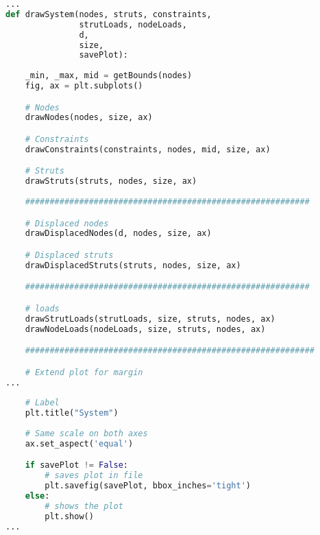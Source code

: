 \begin{inconsolata}
\begin{minipage}{\linewidth}
\begin{lstlisting}[language=python]
...
def drawSystem(nodes, struts, constraints,
               strutLoads, nodeLoads,
               d,
               size,
               savePlot):
    
    _min, _max, mid = getBounds(nodes)
    fig, ax = plt.subplots() 

    # Nodes
    drawNodes(nodes, size, ax)

    # Constraints
    drawConstraints(constraints, nodes, mid, size, ax)

    # Struts
    drawStruts(struts, nodes, size, ax)
    
    ##########################################################

    # Displaced nodes
    drawDisplacedNodes(d, nodes, size, ax)

    # Displaced struts
    drawDisplacedStruts(struts, nodes, size, ax)

    ##########################################################

    # loads
    drawStrutLoads(strutLoads, size, struts, nodes, ax)
    drawNodeLoads(nodeLoads, size, struts, nodes, ax)

    ###########################################################

    # Extend plot for margin
...
    
    # Label
    plt.title("System")
    
    # Same scale on both axes
    ax.set_aspect('equal')

    if savePlot != False:
        # saves plot in file
        plt.savefig(savePlot, bbox_inches='tight')
    else:
        # shows the plot
        plt.show()
...
\end{lstlisting}
\end{minipage}
\end{inconsolata}

\pagebreak

